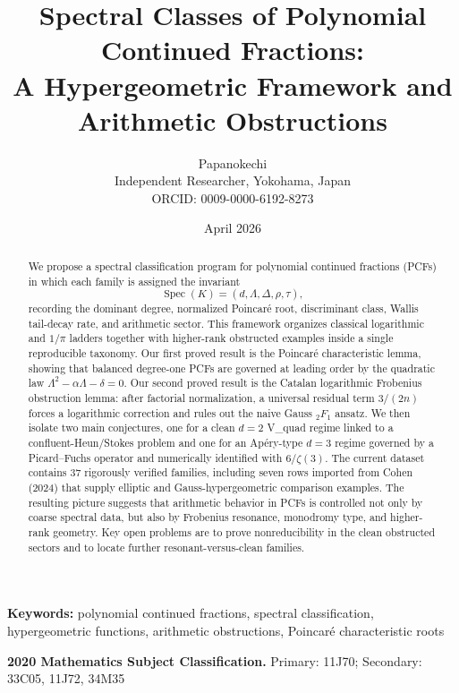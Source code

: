 \documentclass[11pt]{article}
\title{Spectral Classes of Polynomial Continued Fractions:\\A Hypergeometric Framework and Arithmetic Obstructions}
\author{Papanokechi\\
\small Independent Researcher, Yokohama, Japan\\
\small ORCID: 0009-0000-6192-8273}
\date{April 2026}
\begin{document}
\maketitle
\linenumbers

\begin{abstract}
We propose a spectral classification program for polynomial continued fractions (PCFs) in which each family is assigned the invariant
\[
\operatorname{Spec}(K)=(d,\Lambda,\Delta,\rho,\tau),
\]
recording the dominant degree, normalized Poincar\'e root, discriminant class, Wallis tail-decay rate, and arithmetic sector. This framework organizes classical logarithmic and $1/\pi$ ladders together with higher-rank obstructed examples inside a single reproducible taxonomy. Our first proved result is the Poincar\'e characteristic lemma, showing that balanced degree-one PCFs are governed at leading order by the quadratic law $\Lambda^2-\alpha\Lambda-\delta=0$. Our second proved result is the Catalan logarithmic Frobenius obstruction lemma: after factorial normalization, a universal residual term $3/(2n)$ forces a logarithmic correction and rules out the naive Gauss ${}_2F_1$ ansatz. We then isolate two main conjectures, one for a clean $d=2$ V\_quad regime linked to a confluent-Heun/Stokes problem and one for an Ap\'ery-type $d=3$ regime governed by a Picard--Fuchs operator and numerically identified with $6/\zeta(3)$. The current dataset contains 37 rigorously verified families, including seven rows imported from Cohen (2024) that supply elliptic and Gauss-hypergeometric comparison examples. The resulting picture suggests that arithmetic behavior in PCFs is controlled not only by coarse spectral data, but also by Frobenius resonance, monodromy type, and higher-rank geometry. Key open problems are to prove nonreducibility in the clean obstructed sectors and to locate further resonant-versus-clean families.
\end{abstract}

\noindent\textbf{Keywords:} polynomial continued fractions, spectral classification, hypergeometric functions, arithmetic obstructions, Poincar\'e characteristic roots

\noindent\textbf{2020 Mathematics Subject Classification.}
Primary: 11J70;
Secondary: 33C05, 11J72, 34M35

\tableofcontents
\end{document}
